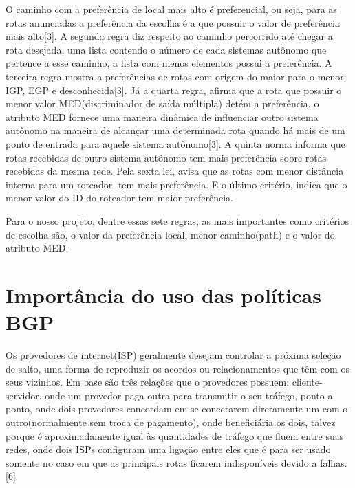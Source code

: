 \documentclass[12pt,a4paper]{report}
\begin{document}
O caminho com a prefer\^encia de local mais alto \'e preferencial, ou seja, para as rotas anunciadas a prefer\^encia da escolha \'e a que possuir o valor de prefer\^encia mais alto[3]. A segunda regra diz respeito ao caminho percorrido at\'e chegar a rota desejada, uma lista contendo o n\'umero de cada sistemas aut\^onomo que pertence a esse caminho, a lista com menos elementos possui a prefer\^encia. A terceira regra mostra a prefer\^encias de rotas com origem do maior para o menor: IGP, EGP e desconhecida[3]. J\'a a quarta regra, afirma que a rota que possuir o menor valor MED(discriminador de sa\'ida m\'ultipla) det\'em a prefer\^encia, o atributo MED fornece uma maneira din\^amica de influenciar outro sistema aut\^onomo na maneira de alcan\c{c}ar uma determinada rota quando h\'a mais de um ponto de entrada para aquele sistema aut\^onomo[3]. A quinta norma informa que rotas recebidas de outro sistema aut\^onomo tem mais prefer\^encia sobre rotas recebidas da mesma rede. Pela sexta lei, avisa que as rotas com menor dist\^ancia interna para um roteador, tem mais prefer\^encia. E o \'ultimo crit\'erio, indica que o menor valor do ID do roteador tem maior prefer\^encia.

Para o nosso projeto, dentre essas sete regras, as mais importantes como crit\'erios de escolha s\~ao, o valor da prefer\^encia local, menor caminho(path) e o valor do atributo MED.

\section{Import\^ancia do uso das pol\'iticas BGP}

Os provedores de internet(ISP) geralmente desejam controlar a pr\'oxima sele\c{c}\~ao de salto, uma forma de reproduzir os acordos ou relacionamentos que t\^em com os seus vizinhos. Em base s\~ao tr\^es rela\c{c}\~oes que o provedores possuem: cliente-servidor, onde um provedor paga outra para transmitir o seu tr\'afego, ponto a ponto, onde dois provedores concordam em se conectarem diretamente um com o outro(normalmente sem troca de pagamento), onde benefici\'aria os dois, talvez porque \'e aproximadamente igual \`as quantidades de tr\'afego que fluem entre suas redes, onde dois ISPs configuram uma liga\c{c}\~ao entre eles que \'e para ser usado somente no caso em que as principais rotas ficarem indispon\'iveis devido a falhas.[6]
\end{document}
